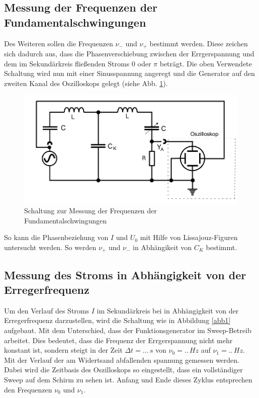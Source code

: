 \documentclass[11pt,ngerman,a4paper]{article}
\begin{document}
\subsection{Messung der Frequenzen der Fundamentalschwingungen}
Des Weiteren sollen die Frequenzen $\nu_-$ und $\nu_+$ bestimmt werden. Diese zeichen sich dadurch aus, dass die Phasenverschiebung zwischen der Errgerspannung und dem im Sekundärkreis fließenden Stroms $0$ oder $\pi$ beträgt. Die oben Verwendete Schaltung wird nun mit einer Sinusspannung angeregt und die Generator auf den zweiten Kanal des Oszilloskops gelegt (siehe Abb. \ref{abb3}).
\begin{figure}[h!]
\centering
\includegraphics[scale=0.5]{Abb/abb3.png}
\caption{Schaltung zur Messung der Frequenzen der Fundamentalschwingungen}
\label{abb3}
\end{figure}
 So kann die Phasenbeziehung von $I$ und $U_0$ mit Hilfe von Lissajouz-Figuren untersucht werden. So werden $\nu_+$ und $\nu_-$ in Abhängikeit von $C_K$ bestimmt.
\subsection{Messung des Stroms in Abhängigkeit von der Erregerfrequenz}
Um den Verlauf des Stroms $I$ im Sekundärkreis bei in Abhängigkeit von der Erregerfrequenz darzustellen, wird die Schaltung wie in Abbildung \ref{abb1} aufgebaut. Mit dem Unterschied, dass der Funktionsgenerator im Sweep-Betreib arbeitet. Dies bedeutet, dass die Frequenz der Errgerspannung nicht mehr konstant ist, sondern steigt in der Zeit $\Delta t = ...\,s$ von $\nu_0 = ..\,Hz$ auf $\nu_1 = ..\,Hz$. Mit der Verlauf der am Widertsand abfallenden spannung gemessen werden. Dabei wird die Zeitbasis des Oszilloskops so eingestellt, dass ein vollständiger Sweep auf dem Schirm zu sehen ist. Anfang und Ende dieses Zyklus entsprechen den Frequenzen $\nu_0$ und $\nu_1$.     
\end{document}
